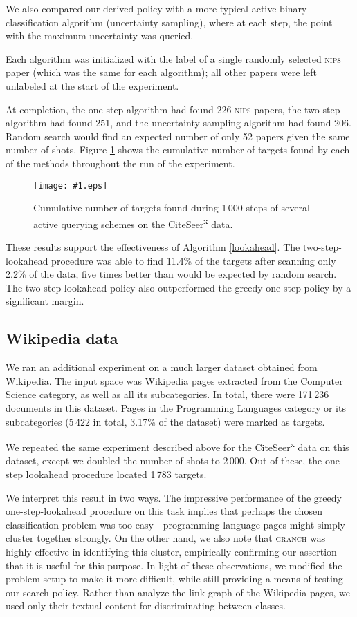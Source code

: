 \documentclass{article}
\newcommand{\psff}[1]{\texttt{[image: \#1.eps]}}
\begin{document}
We also compared our derived policy with a more typical active
binary-classification algorithm (uncertainty sampling), where at each
step, the point with the maximum uncertainty was queried.

Each algorithm was initialized with the label of a single randomly
selected \textsc{nips} paper (which was the same for each algorithm);
all other papers were left unlabeled at the start of the experiment.

At completion, the one-step algorithm had found 226 \textsc{nips}
papers, the two-step algorithm had found 251, and the uncertainty
sampling algorithm had found 206.  Random search would find an
expected number of only 52 papers given the same number of shots.
Figure \ref{citeseerresults} shows the cumulative number of targets
found by each of the methods throughout the run of the experiment.

\begin{figure}
  \centering
  \psff{fig}
  \caption{Cumulative number of targets found during 1\,000 steps of
    several active querying schemes on the CiteSeer\textsuperscript{x}
    data.
  }
  \label{citeseerresults}
\end{figure}

These results support the effectiveness of Algorithm \ref{lookahead}.
The two-step-lookahead procedure was able to find 11.4\% of the
targets after scanning only 2.2\% of the data, five times better than
would be expected by random search.  The two-step-lookahead policy
also outperformed the greedy one-step policy by a significant margin.

\subsection{Wikipedia data}

We ran an additional experiment on a much larger dataset obtained from
Wikipedia.  The input space was Wikipedia pages extracted from the
Computer Science category, as well as all its subcategories.  In
total, there were 171\,236 documents in this dataset.  Pages in the
Programming Languages category or its subcategories (5\,422 in total,
3.17\% of the dataset) were marked as targets.

We repeated the same experiment described above for the
CiteSeer\textsuperscript{x} data on this dataset, except we doubled
the number of shots to 2\,000.  Out of these, the one-step lookahead
procedure located 1\,783 targets.

We interpret this result in two ways.  The impressive performance of
the greedy one-step-lookahead procedure on this task implies that
perhaps the chosen classification problem was too
easy---programming-language pages might simply cluster together
strongly.  On the other hand, we also note that \textsc{granch} was
highly effective in identifying this cluster, empirically confirming
our assertion that it is useful for this purpose. In light of these
observations, we modified the problem setup to make it more difficult,
while still providing a means of testing our search policy.  Rather
than analyze the link graph of the Wikipedia pages, we used only their
textual content for discriminating between classes.
\end{document}
